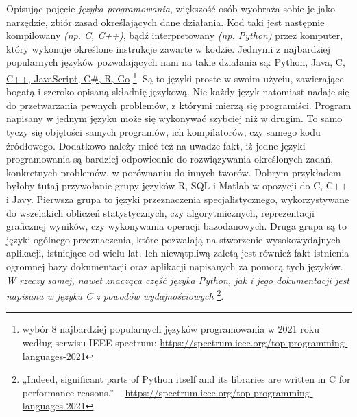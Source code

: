 \documentclass[fleqn,10pt]{SelfArx} %
\begin{document}
	Opisując pojęcie \textit{języka programowania}, większość osób wyobraża sobie je jako narzędzie,
	zbiór zasad określających dane działania. Kod taki jest następnie kompilowany \textit{(np. C, C++)}, 
	bądź interpretowany \textit{(np. Python)} przez komputer, który wykonuje określone instrukcje zawarte w kodzie.
	Jednymi z najbardziej popularnych języków pozwalających nam na takie działania są: \underline{Python, Java, C, C++, JavaScript, C\#, R, Go}
	\cite{IEEESpectrum:popularLang2021}\footnote{wybór 8 najbardziej popularnych języków programowania w 2021 roku według serwisu IEEE spectrum:
	\url{https://spectrum.ieee.org/top-programming-languages-2021}}.
	Są to języki proste w swoim użyciu, zawierające bogatą i szeroko opisaną składnię językową. 
	Nie każdy język natomiast nadaje się do przetwarzania pewnych problemów, z którymi mierzą się programiści. 
	Program napisany w jednym języku może się wykonywać szybciej niż w drugim. To samo tyczy się objętości samych programów, 
	ich kompilatorów, czy samego kodu źródłowego. Dodatkowo należy mieć też na uwadze fakt, 
	iż jedne języki programowania są bardziej odpowiednie do rozwiązywania określonych zadań, konkretnych problemów, 
	w porównaniu do innych tworów.
	\indent Dobrym przykładem byłoby tutaj przywołanie grupy języków R, SQL i Matlab w opozycji do C, C++ i Javy. 
	Pierwsza grupa to języki przeznaczenia specjalistycznego, wykorzystywane do wszelakich obliczeń statystycznych, 
	czy algorytmicznych, reprezentacji graficznej wyników, czy wykonywania operacji bazodanowych. 
	Druga grupa są to języki ogólnego przeznaczenia, które pozwalają na stworzenie wysokowydajnych aplikacji, istniejące od wielu lat. 
	Ich niewątpliwą zaletą jest również fakt istnienia ogromnej bazy dokumentacji oraz aplikacji napisanych za pomocą tych języków. 
	\textit{W rzeczy samej, nawet znacząca część języka Python, jak i jego dokumentacji jest napisana w języku C z powodów wydajnościowych}
	\cite{IEEESpectrum:popularLang2021}\footnote{„Indeed, significant parts of Python itself and its libraries are written in C for performance reasons.” ~ \url{https://spectrum.ieee.org/top-programming-languages-2021}}.

\end{document}
